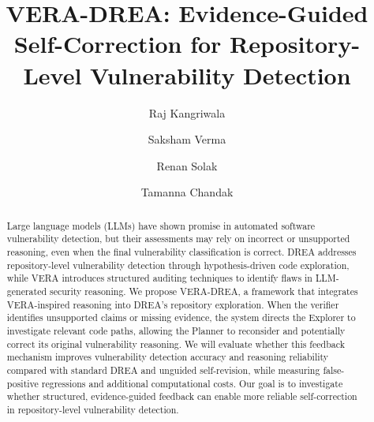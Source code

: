 \documentclass[sigconf,nonacm]{acmart}
\begin{document}
\title{VERA-DREA: Evidence-Guided Self-Correction for Repository-Level Vulnerability Detection}

\author{Raj Kangriwala}

\author{Saksham Verma}

\author{Renan Solak}

\author{Tamanna Chandak}


\begin{abstract}
Large language models (LLMs) have shown promise in automated software vulnerability detection, but their assessments may rely on incorrect or unsupported reasoning, even when the final vulnerability classification is correct. DREA addresses repository-level vulnerability detection through hypothesis-driven code exploration, while VERA introduces structured auditing techniques to identify flaws in LLM-generated security reasoning. We propose VERA-DREA, a framework that integrates VERA-inspired reasoning into DREA's repository exploration. When the verifier identifies unsupported claims or missing evidence, the system directs the Explorer to investigate relevant code paths, allowing the Planner to reconsider and potentially correct its original vulnerability reasoning. We will evaluate whether this feedback mechanism improves vulnerability detection accuracy and reasoning reliability compared with standard DREA and unguided self-revision, while measuring false-positive regressions and additional computational costs. Our goal is to investigate whether structured, evidence-guided feedback can enable more reliable self-correction in repository-level vulnerability detection.
\end{abstract}

\maketitle
\end{document}
